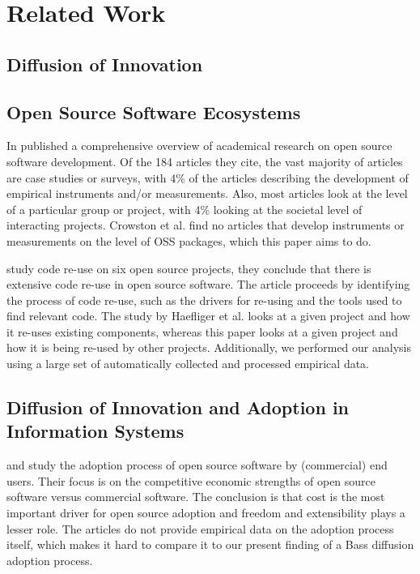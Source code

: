 \documentclass[smallextended,final]{svjour3}
\begin{document}
\section{Related Work}



\subsection{Diffusion of Innovation}



\subsection{ Open Source Software Ecosystems}
In \citet{crowston08} published a comprehensive overview of academical research on open source software development. Of the 184 articles they cite, the vast majority of articles are case studies or surveys, with 4\% of the articles describing the development of empirical instruments and/or measurements. Also, most articles look at the level of a particular group or project, with 4\% looking at the societal level of interacting projects. Crowston et al. find no articles that develop instruments or measurements on the level of OSS packages, which this paper aims to do.


\citet{haefliger08} study code re-use on six open source projects, they conclude that there is extensive code re-use in open source software. The article proceeds by identifying the process of code re-use, such as the drivers for re-using and the tools used to find relevant code. The study by Haefliger et al. looks at a given project and how it  re-uses existing components, whereas this paper looks at a given project and how it is being re-used by other projects. Additionally, we performed our analysis using a large set of automatically collected and processed empirical data.

\subsection{Diffusion of Innovation and Adoption in Information Systems}

\citet{dedrick04} and \citet{chen06} study the adoption process of open source software by (commercial) end users. Their focus is on the competitive economic strengths of open source software versus commercial software. The conclusion is that cost is the most important driver for open source adoption and freedom and extensibility plays a lesser role. The articles do not provide empirical data on the adoption process itself, which makes it hard to compare it to our present finding of a Bass diffusion adoption process.
\end{document}
